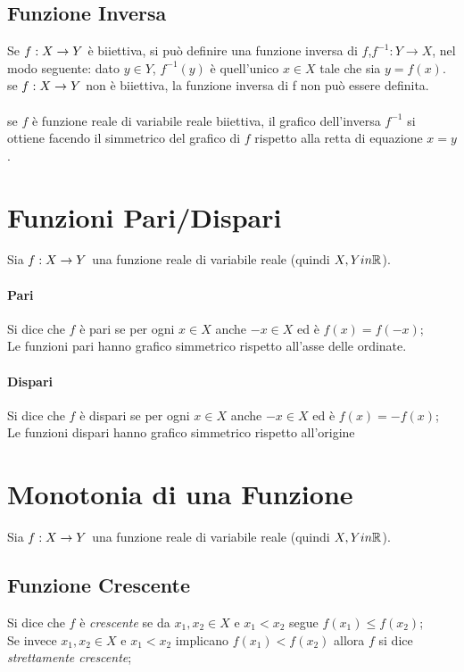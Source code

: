 \documentclass[12pt, a4paper, openany]{book}
\begin{document}
\subsection*{Funzione Inversa}
Se $f: X \rightarrow Y$ è biiettiva, si può definire una funzione inversa di $f$,$f^{-1} : Y \rightarrow X$, nel modo seguente:
dato $y \in Y$, $f^{-1}(y)$ è quell'unico $x \in X$ tale che sia $y = f(x)$.
se $f: X \rightarrow Y$ non è biiettiva, la funzione inversa di f non può essere definita.
\paragraph*{} se $f$ è funzione reale di variabile reale biiettiva, il grafico dell'inversa $f^{-1}$ si ottiene facendo il simmetrico del grafico di $f$ rispetto alla retta di equazione $x=y$.

\section{Funzioni Pari/Dispari}
Sia $f: X \rightarrow Y$ una funzione reale di variabile reale (quindi $X, Y in \mathbb{R}$).
\paragraph*{Pari}
Si dice che $f$ è pari se per ogni $x \in X$ anche $-x \in X$ ed è $f(x) = f(-x)$;
\\Le funzioni pari hanno grafico simmetrico rispetto all'asse delle ordinate.
\paragraph*{Dispari}
Si dice che $f$ è dispari se per ogni $x \in X$ anche $-x \in X$ ed è $f(x) = -f(x)$;
\\Le funzioni dispari hanno grafico simmetrico rispetto all'origine

\section{Monotonia di una Funzione}
Sia $f: X \rightarrow Y$ una funzione reale di variabile reale (quindi $X, Y in \mathbb{R}$).

\subsection*{Funzione Crescente}
Si dice che $f$ è \emph{crescente} se da $x_1, x_2 \in X$ e $x_1 < x_2$ segue $f(x_1) \leq f(x_2)$;
\\Se invece $x_1, x_2 \in X$ e $x_1 < x_2$ implicano $f(x_1) < f(x_2)$ allora $f$ si dice \emph{strettamente crescente};
\end{document}
